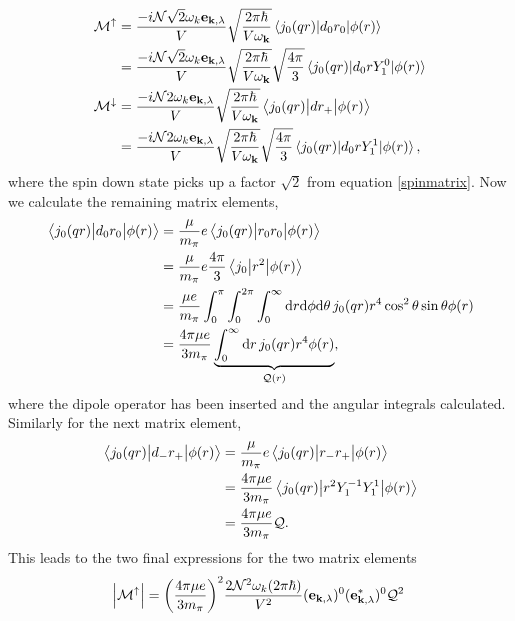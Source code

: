 \begin{align}
    \mathcal{M}^{\uparrow} &=\frac{-i\mathcal{N}\sqrt{2}\omega_k\bm{\mathrm{e}}_{\bm{\mathrm{k}},\lambda}}{V}\sqrt{\frac{2\pi\hbar}{V\omega_{\bm{\mathrm{k}}}}}\mel*{j_0(qr)}{d_0 r_0}{\phi(r)}  \\
    &= \frac{-i\mathcal{N}\sqrt{2}\omega_k\bm{\mathrm{e}}_{\bm{\mathrm{k}},\lambda}}{V}\sqrt{\frac{2\pi\hbar}{V\omega_{\bm{\mathrm{k}}}}}\sqrt{\frac{4\pi}{3}}\mel*{j_0(qr)}{d_0 r Y_1^0}{\phi(r)} \\
    \mathcal{M}^{\downarrow} & = \frac{-i\mathcal{N}2\omega_k\bm{\mathrm{e}}_{\bm{\mathrm{k}},\lambda}}{V}\sqrt{\frac{2\pi\hbar}{V\omega_{\bm{\mathrm{k}}}}} \mel{j_0(qr)}{d r_{+}}{\phi(r)}\\
    &=\frac{-i\mathcal{N}2\omega_k\bm{\mathrm{e}}_{\bm{\mathrm{k}},\lambda}}{V}\sqrt{\frac{2\pi\hbar}{V\omega_{\bm{\mathrm{k}}}}}\sqrt{\frac{4\pi}{3}}\mel*{j_0(qr)}{d_0 r Y_1^1}{\phi(r)}, \\
\end{align}
where the spin down state picks up a factor $\sqrt{2}$ from equation \ref{spinmatrix}. Now we calculate the remaining matrix elements,
\begin{align}
    \mel{j_0(qr)}{d_0 r_0}{\phi(r)} &= \frac{\mu}{m_\pi}e \mel{j_0(qr)}{r_0r_0}{\phi(r)} \\
    &= \frac{\mu}{m_\pi}e\frac{4\pi}{3} \mel{j_0}{r^2}{\phi(r)} \\
    &= \frac{\mu e }{m_\pi} \int_0^\pi \int_0^{2\pi} \int_0^\infty \text{d}r \text{d}\phi \text{d}\theta \, j_0(qr)r^4\cos^2\theta \sin\theta \phi(r) \\
    &= \frac{4\pi \mu e}{3m_\pi} \underbrace{\int_0^\infty \text{d}r \, j_0(qr)r^4\phi(r)}_{\mathcal{Q}(r)},
\end{align}
where the dipole operator has been inserted and the angular integrals calculated. Similarly for the next matrix element,
\begin{align}
    \mel{j_0(qr)}{d_{-}r_{+}}{\phi(r)} &= \frac{\mu}{m_\pi}e \mel{j_0(qr)}{r_{-}r_{+}}{\phi(r)} \\
    &= \frac{4\pi \mu e}{3 m_\pi} \mel{j_0(qr)}{r^2 Y_1^{-1}Y_1^1}{\phi(r)} \\
    &= \frac{4\pi \mu e}{3 m_\pi} \mathcal{Q}. 
\end{align}
This leads to the two final expressions for the two matrix elements
\begin{equation}
    \abs{\mathcal{M}^\uparrow} = \bigg( \frac{4\pi \mu e}{3m_\pi}\bigg)^2 \frac{2 \mathcal{N}^2\omega_k (2\pi \hbar)}{V^2}(\bm{\mathrm{e}}_{\bm{\mathrm{k}},\lambda})^0(\bm{\mathrm{e}}_{\bm{\mathrm{k}},\lambda}^*)^0 \mathcal{Q}^2 
\end{equation}
